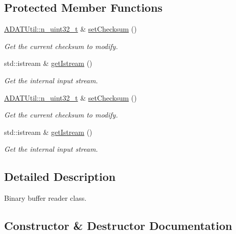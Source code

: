 \subsection*{Protected Member Functions}
\begin{DoxyCompactItemize}
\item 
\mbox{\hyperlink{namespaceADATUtil_ad945a8afa4db2d1f89b731964adae97e}{A\+D\+A\+T\+Util\+::n\+\_\+uint32\+\_\+t}} \& \mbox{\hyperlink{classADATIO_1_1BinaryBufferReader_a3976e5ece3392d04158307f864a84bb7}{set\+Checksum}} ()
\begin{DoxyCompactList}\small\item\em Get the current checksum to modify. \end{DoxyCompactList}\item 
std\+::istream \& \mbox{\hyperlink{classADATIO_1_1BinaryBufferReader_a32d746446a4c990f3c592a32753d7207}{get\+Istream}} ()
\begin{DoxyCompactList}\small\item\em Get the internal input stream. \end{DoxyCompactList}\item 
\mbox{\hyperlink{namespaceADATUtil_ad945a8afa4db2d1f89b731964adae97e}{A\+D\+A\+T\+Util\+::n\+\_\+uint32\+\_\+t}} \& \mbox{\hyperlink{classADATIO_1_1BinaryBufferReader_a3976e5ece3392d04158307f864a84bb7}{set\+Checksum}} ()
\begin{DoxyCompactList}\small\item\em Get the current checksum to modify. \end{DoxyCompactList}\item 
std\+::istream \& \mbox{\hyperlink{classADATIO_1_1BinaryBufferReader_a32d746446a4c990f3c592a32753d7207}{get\+Istream}} ()
\begin{DoxyCompactList}\small\item\em Get the internal input stream. \end{DoxyCompactList}\end{DoxyCompactItemize}


\subsection{Detailed Description}
Binary buffer reader class. 

\subsection{Constructor \& Destructor Documentation}
\mbox{\label{classADATIO_1_1BinaryBufferReader_a9bb5e29231fc81acbe7f0e6ab2720f6c}} 
